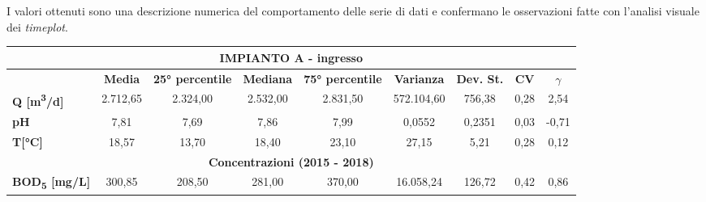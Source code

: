 I valori ottenuti sono una descrizione numerica del comportamento delle serie di dati e confermano le osservazioni fatte con l'analisi visuale dei \textit{timeplot}.



\begin{sidewaystable}[h]
	\scriptsize
	\begin{center}
	\begin{tabular}{l|c|c|c|c|c|c|c|c|}
		\hline
		\multicolumn{9}{|c|}{\textbf{IMPIANTO A - ingresso}} \\
		\hline
		
		& \textbf{Media}            & \textbf{25° percentile}   & \textbf{Mediana}          & \textbf{75° percentile}   & \textbf{Varianza}                 & \textbf{Dev. St.}                  & \textbf{CV}               & \textbf{$\gamma$}            \\ \hline
		\multicolumn{1}{|l|}{\textbf{Q {[}m\textsuperscript{3}/d{]}}}             & 2.712,65                  & 2.324,00                  & 2.532,00                  & 2.831,50                  & 572.104,60                  & 756,38                      & 0,28                      & 2,54                      \\ \hline
			\multicolumn{1}{|l|}{\textbf{pH}}                       & 7,81                      & 7,69                      & 7,86                      & 7,99                      & 0,0552                      & 0,2351                      & 0,03                      & -0,71                     \\ \hline
		\multicolumn{1}{|l|}{\textbf{T{[}°C{]}}}              & 18,57                     & 13,70                     & 18,40                     & 23,10                     & 27,15                       & 5,21                        & 0,28                      & 0,12                      \\ \hline
		\multicolumn{9}{|c|}{\textbf{Concentrazioni (2015 - 2018)}}                                                                                                                                                                                                                                 \\ \hline
		\multicolumn{1}{|l|}{\textbf{BOD\textsubscript{5} {[}mg/L{]}}}          & 300,85                    & 208,50                    & 281,00                    & 370,00                    & 16.058,24                   & 126,72                      & 0,42                      & 0,86                      \\ \hline

\end{tabular}
\end{center}
\end{sidewaystable}
